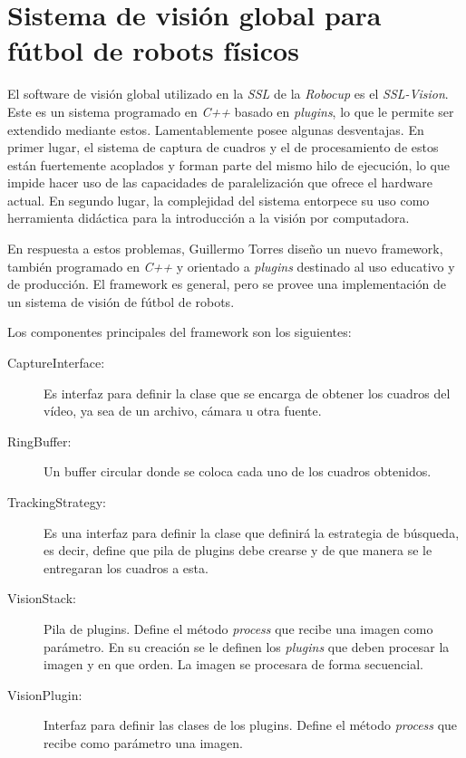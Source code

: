 
\section{Sistema de visión global para fútbol de robots físicos}

El software de visión global utilizado en la \emph{SSL} de la \emph{Robocup} es
el \emph{SSL-Vision}. Este es un sistema programado en \emph{C++} basado en
\emph{plugins}, lo que le permite ser extendido mediante estos. Lamentablemente
posee algunas desventajas. En primer lugar, el sistema de captura de cuadros y
el de procesamiento de estos están fuertemente acoplados y forman parte del
mismo hilo de ejecución, lo que impide hacer uso de las capacidades de
paralelización que ofrece el hardware actual. En segundo lugar, la complejidad
del sistema entorpece su uso como herramienta didáctica para la introducción a
la visión por computadora.

En respuesta a estos problemas, Guillermo Torres\cite{torres2014} diseño un
nuevo framework, también programado en \emph{C++} y orientado a \emph{plugins}
destinado al uso educativo y de producción. El framework es general, pero se
provee una implementación de un sistema de visión de fútbol de robots.

Los componentes principales del framework son los siguientes:

\begin{description}

	\item[CaptureInterface:] Es interfaz para definir la clase que se
		encarga de obtener los cuadros del vídeo, ya sea de un archivo,
		cámara u otra fuente.

	\item[RingBuffer:] Un buffer circular donde se coloca cada uno de los
		cuadros obtenidos.

	\item[TrackingStrategy:] Es una interfaz para definir la clase que
		definirá la estrategia de búsqueda, es decir, define que pila de
		plugins debe crearse y de que manera se le entregaran los
		cuadros a esta.

	
	\item[VisionStack:] Pila de plugins. Define el método \emph{process} que
		recibe una imagen como parámetro. En su creación se le definen
		los \emph{plugins} que deben procesar la imagen y en que orden.
		La imagen se procesara de forma secuencial.

	\item[VisionPlugin:] Interfaz para definir las clases de los plugins.
		Define el método \emph{process} que recibe como parámetro una
		imagen.

\end{description}

